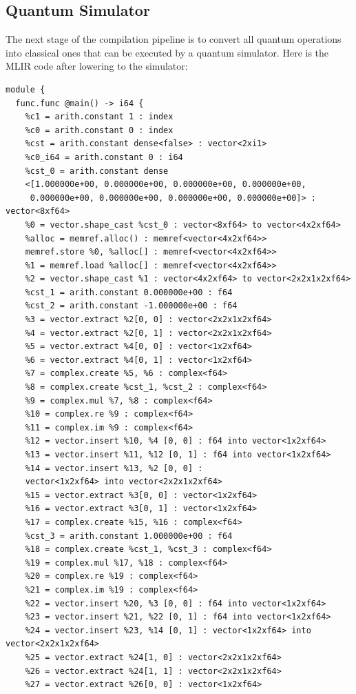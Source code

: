 \subsection{Quantum Simulator}
The next stage of the compilation pipeline is to convert all quantum operations into
classical ones that can be executed by a quantum simulator.
Here is the MLIR code after lowering to the simulator:
\begin{verbatim}
module {
  func.func @main() -> i64 {
    %c1 = arith.constant 1 : index
    %c0 = arith.constant 0 : index
    %cst = arith.constant dense<false> : vector<2xi1>
    %c0_i64 = arith.constant 0 : i64
    %cst_0 = arith.constant dense
    <[1.000000e+00, 0.000000e+00, 0.000000e+00, 0.000000e+00, 
     0.000000e+00, 0.000000e+00, 0.000000e+00, 0.000000e+00]> : vector<8xf64>
    %0 = vector.shape_cast %cst_0 : vector<8xf64> to vector<4x2xf64>
    %alloc = memref.alloc() : memref<vector<4x2xf64>>
    memref.store %0, %alloc[] : memref<vector<4x2xf64>>
    %1 = memref.load %alloc[] : memref<vector<4x2xf64>>
    %2 = vector.shape_cast %1 : vector<4x2xf64> to vector<2x2x1x2xf64>
    %cst_1 = arith.constant 0.000000e+00 : f64
    %cst_2 = arith.constant -1.000000e+00 : f64
    %3 = vector.extract %2[0, 0] : vector<2x2x1x2xf64>
    %4 = vector.extract %2[0, 1] : vector<2x2x1x2xf64>
    %5 = vector.extract %4[0, 0] : vector<1x2xf64>
    %6 = vector.extract %4[0, 1] : vector<1x2xf64>
    %7 = complex.create %5, %6 : complex<f64>
    %8 = complex.create %cst_1, %cst_2 : complex<f64>
    %9 = complex.mul %7, %8 : complex<f64>
    %10 = complex.re %9 : complex<f64>
    %11 = complex.im %9 : complex<f64>
    %12 = vector.insert %10, %4 [0, 0] : f64 into vector<1x2xf64>
    %13 = vector.insert %11, %12 [0, 1] : f64 into vector<1x2xf64>
    %14 = vector.insert %13, %2 [0, 0] : 
    vector<1x2xf64> into vector<2x2x1x2xf64>
    %15 = vector.extract %3[0, 0] : vector<1x2xf64>
    %16 = vector.extract %3[0, 1] : vector<1x2xf64>
    %17 = complex.create %15, %16 : complex<f64>
    %cst_3 = arith.constant 1.000000e+00 : f64
    %18 = complex.create %cst_1, %cst_3 : complex<f64>
    %19 = complex.mul %17, %18 : complex<f64>
    %20 = complex.re %19 : complex<f64>
    %21 = complex.im %19 : complex<f64>
    %22 = vector.insert %20, %3 [0, 0] : f64 into vector<1x2xf64>
    %23 = vector.insert %21, %22 [0, 1] : f64 into vector<1x2xf64>
    %24 = vector.insert %23, %14 [0, 1] : vector<1x2xf64> into vector<2x2x1x2xf64>
    %25 = vector.extract %24[1, 0] : vector<2x2x1x2xf64>
    %26 = vector.extract %24[1, 1] : vector<2x2x1x2xf64>
    %27 = vector.extract %26[0, 0] : vector<1x2xf64>

\end{verbatim}
